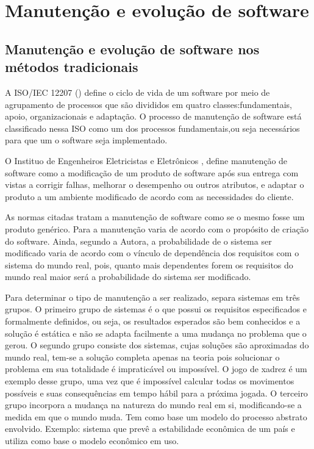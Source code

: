\chapter{Manutenção e evolução de software}
\label{cap-evol-software}

\section{Manutenção e evolução de software nos métodos tradicionais}
\label{sect-manut-evol-soft}

A ISO/IEC 12207 (\citeyear{iso12207}) define o ciclo de vida de um software por meio de agrupamento de processos que são divididos em quatro classes:fundamentais, apoio, organizacionais e adaptação. O processo de manutenção de software está classificado nessa ISO como um dos processos fundamentais,ou seja necessários para que um o software seja implementado.


O Instituo de Engenheiros Eletricistas e Eletrônicos \cite{ieee1219}, define manutenção de software como a modificação de um produto de software após sua entrega com vistas a corrigir falhas, melhorar o desempenho ou outros atributos, e adaptar o produto a um ambiente modificado de acordo com as necessidades do cliente.

As normas citadas tratam a manutenção de software como se o mesmo fosse um produto genérico. Para  a manutenção varia de acordo com o propósito de criação do software. Ainda, segundo a Autora, a probabilidade de o sistema ser modificado varia de acordo com o vínculo de dependência dos requisitos com o sistema do mundo real, pois, quanto mais dependentes forem os requisitos do mundo real maior será a probabilidade do sistema ser modificado.

Para determinar o tipo de manutenção a ser realizado, separa sistemas em três grupos. O primeiro grupo de sistemas é o que possui os requisitos especificados e formalmente definidos, ou seja, os resultados esperados são bem conhecidos e a solução é estática e não se adapta facilmente a uma mudança no problema que o gerou. O segundo grupo consiste dos sistemas, cujas soluções são aproximadas do mundo real, tem-se a solução completa apenas na teoria pois solucionar o problema em sua totalidade é impraticável ou impossível. O jogo de xadrez é um exemplo desse grupo, uma vez que é impossível calcular todas os movimentos possíveis e suas consequências em tempo hábil para a próxima jogada. O terceiro grupo incorpora a mudança na natureza do mundo real em si,  modificando-se a medida em que o mundo muda. Tem como base um modelo do processo abstrato envolvido. Exemplo: sistema que prevê a estabilidade econômica de um país e utiliza como base o modelo econômico em uso.

